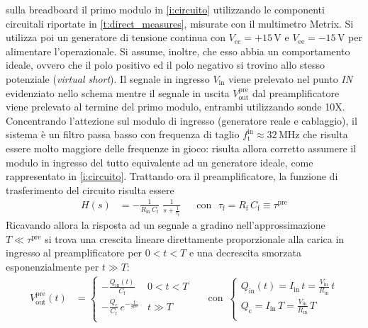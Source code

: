 \documentclass[a4paper,11pt]{article} %
\begin{document}
\noindent sulla breadboard il primo modulo in \autoref{i:circuito} utilizzando le componenti circuitali riportate in
\autoref{t:direct_measures}, misurate con il multimetro Metrix. Si utilizza poi un generatore di tensione continua con
$V_{\text{cc}}=+15\,\si{\volt}$ e $V_{\text{ee}}=-15\,\si{\volt}$ per alimentare l'operazionale. Si assume, inoltre, che
esso abbia un comportamento ideale, ovvero che il polo positivo ed il polo negativo si trovino allo stesso potenziale
(\textit{virtual short}). Il segnale in ingresso $V_{\text{in}}$ viene prelevato nel punto \textit{IN} evidenziato nello
schema mentre il segnale in uscita $V^{\text{pre}}_{\text{out}}$ dal preamplificatore viene prelevato al termine del
primo modulo, entrambi utilizzando sonde 10X. Concentrando l'attezione sul modulo di ingresso (generatore reale e
cablaggio), il sistema è un filtro passa basso con frequenza di taglio $f_{\text{t}}^{\text{in}}\approx 32 \,\si{\MHz}$
che risulta essere molto maggiore delle frequenze in gioco: risulta allora corretto assumere il modulo in ingresso del
tutto equivalente ad un generatore ideale, come rappresentato in \autoref{i:circuito}. Trattando ora il preamplificatore,
la funzione di trasferimento del circuito risulta essere 
\begin{align}\label{e:preamp_H}
	H(s) &= - \frac{ 1 }{ R_{\text{in}}\,C_{\text{f}} } \,\, \frac{1}{ s + \frac{ 1 }{ \tau_{\text{f}} } } & 
	&\text{con  } \,\, \tau_{\text{f}} = R_{\text{f}}\,C_{\text{f}} \equiv \tau^{\text{pre}}
\end{align}
\noindent Ricavando allora la risposta ad un segnale a gradino nell'approssimazione $T\ll\tau^{\text{pre}}$ si trova una
crescita lineare direttamente proporzionale alla carica in ingresso al preamplificatore per $0 < t < T$ e una
decrescita smorzata esponenzialmente per $t \gg T$:
\begin{align}\label{e:preamp_vout}
	V^{\text{pre}}_{\text{out}}(t) &= 
	\begin{cases} 
		-\frac{ Q_{\text{in}} (t) }{ C_{\text{f}} } & 0 < t < T \\
		-\frac{ Q_{\text{c}} }{ C_{\text{f}} } \, e^{ -\frac{ t }{ \tau^{\text{pre}} } } & t \gg T \\
	\end{cases}
	& 
	&\text{con} \,\,\, 
	\begin{cases} 
		Q_{\text{in}} (t) = I_{\text{in}}\,t = \frac{ V_{\text{in}} }{ R_{\text{in}} }\,t \\
		Q_{\text{c}} = I_{\text{in}}\,T = \frac{ V_{\text{in}} }{ R_{\text{in}} }\,T \\
	\end{cases}
\end{align}	
\end{document}
